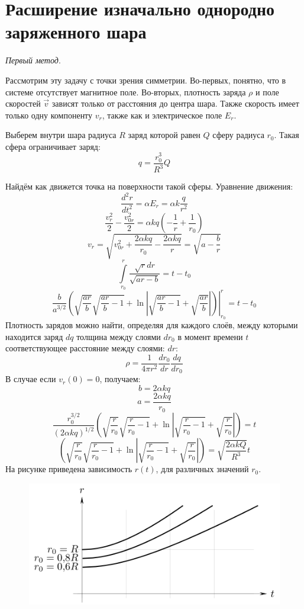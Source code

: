 \section{Расширение изначально однородно заряженного шара}

\textit{Первый метод}. 

Рассмотрим эту задачу с точки зрения симметрии. Во-первых, понятно, что в системе отсутствует магнитное поле. Во-вторых, плотность заряда $\rho$ и поле скоростей $\vec{v}$ зависят только от расстояния до центра шара. Также скорость имеет только одну компоненту $v_r$, также как и электрическое поле $E_r$.
 
Выберем внутри шара радиуса $R$ заряд которой равен $Q$ сферу радиуса $r_0$. Такая сфера ограничивает заряд:
\[
	q = \frac{r_0^3}{R^3} Q
\]

Найдём как движется точка на поверхности такой сферы. Уравнение движения:
\[
	\frac{d^2 r}{dt^2} = \alpha E_r = \alpha  k \frac{q}{r^2}
\]
\[
	\frac{v_r^2}{2} - \frac{v_{0r}^2}{2} = \alpha k q \left(- \frac{1}{r} + \frac{1}{r_0}\right)
\]
\[
	v_r = \sqrt{v_{0r}^2 + \frac{2\alpha kq}{r_0} - \frac{2\alpha k q}{r}} = \sqrt{a - \frac{b}{r}}
\]
\[
	\int\limits_{r_0}^{r} 
	\frac{\sqrt{r} dr}{\sqrt{ar - b}}
	=
	t - t_0
\]
\[
	\frac{b}{a^{3/2}} 
	\left.
	\left(\sqrt{\frac{ar}{b}} \sqrt{\frac{ar}{b}-1} + 
	\ln \left|\sqrt{\frac{ar}{b} - 1} + \sqrt{\frac{ar}{b}}\right|\right) 
	\right|_{r_0}^{r}
	= t - t_0
\]
Плотность зарядов можно найти, определяя для каждого слоёв, между которыми находится заряд $dq$ толщина между слоями $dr_0$ в момент времени $t$ соответствующее расстояние между слоями:
$dr$:
\[
	\rho = \frac{1}{4\pi r^2}\frac{dr_0}{dr}\frac{dq}{dr_0}
\]
В случае если $v_{r}(0) = 0$, получаем:
\[
	b = 2\alpha k q
\]
\[
	a = \frac{2\alpha kq}{r_0}
\]
\[
	\frac{r_0^{3/2}}{(2\alpha k q)^{1/2}} 
	\left(\sqrt{\frac{r}{r_0}} \sqrt{\frac{r}{r_0}-1} + 
	\ln \left|\sqrt{\frac{r}{r_0} - 1} + \sqrt{\frac{r}{r_0}}\right|\right)
	= t
\]
\[
	\left(\sqrt{\frac{r}{r_0}} \sqrt{\frac{r}{r_0}-1} + 
	\ln \left|\sqrt{\frac{r}{r_0} - 1} + \sqrt{\frac{r}{r_0}}\right|\right)
	= \sqrt{
		\frac{2\alpha k Q}{R^{3}} } t
\]
На рисунке приведена зависимость $r(t)$, для различных значений $r_0$.
\begin{figure}[h!]
	\centering
	\includegraphics{images/png/sphere1.png}
\end{figure}